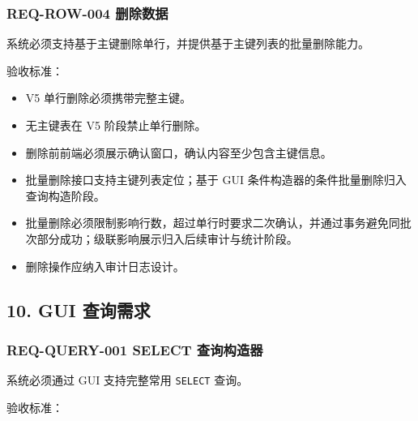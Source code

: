 \documentclass[
  a4paper,
  UTF8]{ctexart}
\providecommand{\tightlist}{%
  \setlength{\itemsep}{0pt}\setlength{\parskip}{0pt}}
\begin{document}
\hypertarget{req-row-004-ux5220ux9664ux6570ux636e}{%
\subsubsection{REQ-ROW-004
删除数据}\label{req-row-004-ux5220ux9664ux6570ux636e}}

系统必须支持基于主键删除单行，并提供基于主键列表的批量删除能力。

验收标准：

\begin{itemize}
\tightlist
\item
  V5 单行删除必须携带完整主键。
\item
  无主键表在 V5 阶段禁止单行删除。
\item
  删除前前端必须展示确认窗口，确认内容至少包含主键信息。
\item
  批量删除接口支持主键列表定位；基于 GUI
  条件构造器的条件批量删除归入查询构造阶段。
\item
  批量删除必须限制影响行数，超过单行时要求二次确认，并通过事务避免同批次部分成功；级联影响展示归入后续审计与统计阶段。
\item
  删除操作应纳入审计日志设计。
\end{itemize}

\hypertarget{gui-ux67e5ux8be2ux9700ux6c42}{%
\subsection{10. GUI 查询需求}\label{gui-ux67e5ux8be2ux9700ux6c42}}

\hypertarget{req-query-001-select-ux67e5ux8be2ux6784ux9020ux5668}{%
\subsubsection{REQ-QUERY-001 SELECT
查询构造器}\label{req-query-001-select-ux67e5ux8be2ux6784ux9020ux5668}}

系统必须通过 GUI 支持完整常用 \texttt{SELECT} 查询。

验收标准：
\end{document}
